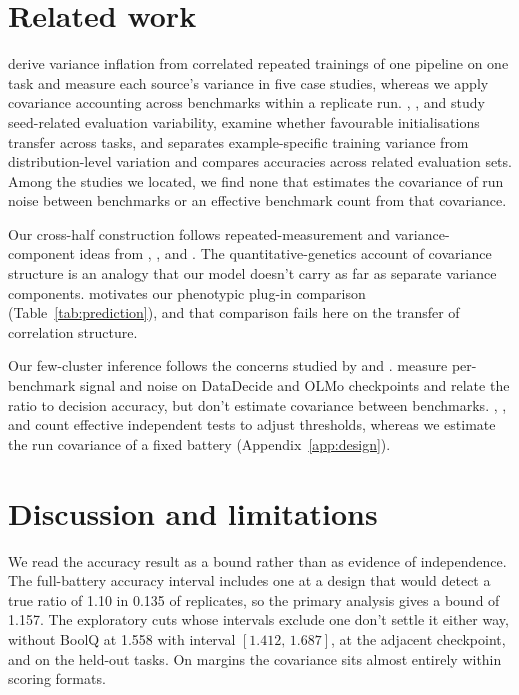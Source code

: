 \documentclass{article}
\newcommand{\ci}[2]{\ensuremath{[#1,\,#2]}}
\begin{document}
\section{Related work}
\citet{bouthillier2021} derive variance inflation from correlated repeated trainings of one pipeline on one task and measure each source's variance in five case studies, whereas we apply covariance accounting across benchmarks within a replicate run. \citet{reimers2017}, \citet{zhou2020}, and \citet{madaan2024} study seed-related evaluation variability, \citet{dodge2020} examine whether favourable initialisations transfer across tasks, and \citet{jordan2024} separates example-specific training variance from distribution-level variation and compares accuracies across related evaluation sets. Among the studies we located, we find none that estimates the covariance of run noise between benchmarks or an effective benchmark count from that covariance.

Our cross-half construction follows repeated-measurement and variance-component ideas from \citet{spearman1904}, \citet{cronbach1951}, and \citet{searle1992}. The quantitative-genetics account of covariance structure \citep{martin1977} is an analogy that our model doesn't carry as far as separate variance components. \citet{cheverud1988} motivates our phenotypic plug-in comparison (Table~\ref{tab:prediction}), and that comparison fails here on the transfer of correlation structure.

Our few-cluster inference follows the concerns studied by \citet{cameron2008} and \citet{mackinnon2017}. \citet{heineman2025} measure per-benchmark signal and noise on DataDecide and OLMo checkpoints and relate the ratio to decision accuracy, but don't estimate covariance between benchmarks. \citet{cheverud2001}, \citet{nyholt2004}, and \citet{li2005} count effective independent tests to adjust thresholds, whereas we estimate the run covariance of a fixed battery (Appendix~\ref{app:design}).

\section{Discussion and limitations}
We read the accuracy result as a bound rather than as evidence of independence. The full-battery accuracy interval includes one at a design that would detect a true ratio of 1.10 in 0.135 of replicates, so the primary analysis gives a bound of 1.157. The exploratory cuts whose intervals exclude one don't settle it either way, without BoolQ at 1.558 with interval \ci{1.412}{1.687}, at the adjacent checkpoint, and on the held-out tasks. On margins the covariance sits almost entirely within scoring formats.
\end{document}
